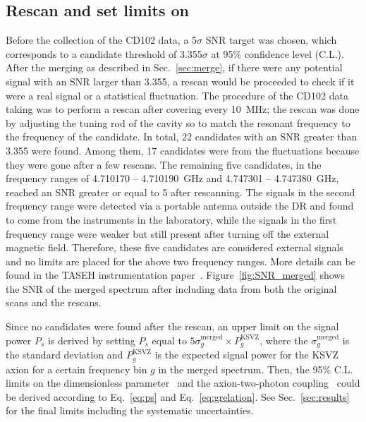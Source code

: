 \subsection{Rescan and set limits on \gagg} 
Before the collection of the CD102 data, a 5$\sigma$ SNR target was chosen, 
which corresponds to a candidate threshold of 3.355$\sigma$ at 95\% 
confidence level (C.L.).
 After the merging as described in Sec.~\ref{sec:merge}, if there were 
any potential signal with an SNR larger than 
3.355, a rescan would be proceeded to check if it were a real signal 
or a statistical fluctuation. 
The procedure of the CD102 data taking was to perform a rescan after 
covering every 10~MHz; the rescan was done by adjusting the tuning rod of the 
cavity so to match the resonant frequency to the frequency of the candidate. 
In total, 22 candidates with an SNR greater than 3.355 were found. 
Among them, 17 candidates were from the fluctuations because they were gone 
after a few rescans. 
The remaining five candidates, in the frequency ranges of 
4.710170 -- 4.710190~GHz and 4.747301 -- 4.747380~GHz, reached an SNR 
greater or equal to 5 after rescanning. The signals in the second frequency 
range were detected via a portable antenna outside the DR and found 
to come from the instruments in the laboratory, while the signals 
in the first frequency range were weaker but still present after 
turning off the external magnetic field. 
Therefore, these five candidates are considered external signals and 
no limits are placed for the above two frequency ranges.  
More details can be found in the 
TASEH instrumentation paper~\cite{TASEHInstrumentation}. 
Figure~\ref{fig:SNR_merged} shows the SNR of the merged spectrum after 
including data from both the original scans and the rescans. 

Since no candidates were found after the rescan, an upper limit on 
the signal power $P_s$ is derived by setting $P_s$ equal to 
$5\sigma_{g}^\text{merged}\times P_{g}^\text{KSVZ}$, where 
the $\sigma_{g}^\text{merged}$ is the standard deviation 
and $P_{g}^\text{KSVZ}$ is the expected signal power for the KSVZ axion 
for a certain frequency bin $g$ in the merged spectrum. 
Then, the 95\% C.L. limits on the dimensionless parameter 
\ggamma\ and the axion-two-photon coupling \gagg\ could be derived 
according to Eq.~\eqref{eq:ps} and Eq.~\eqref{eq:grelation}. 
See Sec.~\ref{sec:results} for the final limits including the systematic 
uncertainties.

